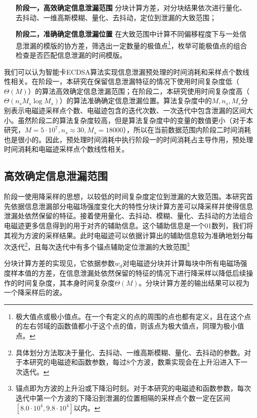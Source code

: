 {	\begin{itemize}
		\item [\textbf{阶段一，高效确定信息泄漏范围}]分块计算方差，对分块结果依次进行量化、去抖动、一维高斯模糊、量化、去抖动，定位到泄漏的大致范围；
		\item [\textbf{阶段二，准确确定信息泄漏位置}]在大致范围中计算不同偏移程度下与一处信息泄漏的模版的协方差，筛选出一定数量的极值点\footnote{极大值点或极小值点。在一个有定义的点的周围的点也都有定义，且在这个点的左右邻域的函数值都小于这个点的值，则该点为极大值点，同理为极小值点。}，枚举可能极值点的组合检查是否匹配信息泄漏的时间模版。
	\end{itemize}

	我们可以认为智能卡ECDSA算法实现信息泄漏预处理的时间消耗和采样点个数线性相关。在阶段一，本研究在保留信息泄漏特征的情况下使用时间复杂度低（$\Theta(M)$）的算法高效确定信息泄漏范围；在阶段二，本研究使用时间复杂度高（$\Theta(n_sM_s\log M_s)$）的算法准确确定信息泄漏位置。算法复杂度中的$M,n_s,M_s$分别表示电磁迹采样点个数、电磁迹包含的迭代次数、一次迭代中包含泄漏的区间大小。虽然阶段二的算法复杂度较高，但是算法复杂度中的变量的数值更小（对于本研究，$M=5\cdot10^7,n_s\approx 30,M_s=18000$），所以在当前数据范围内阶段二时间消耗也是很小的。因此，预处理时间消耗中执行阶段一的时间消耗占主导作用，预处理时间消耗和电磁迹采样点个数线性相关。

	\subsection{高效确定信息泄漏范围}\label{subs:phase1}
	阶段一使用降采样的思想，以较低的时间复杂度定位到泄漏的大致范围。本研究首先依据信息泄漏部分电磁场强度变化大的特性分块计算方差可以降采样并使得信息泄漏处依然保留的特征。接着使用量化、去抖动、模糊、量化、去抖动的方法组合电磁迹更多信息得到的用于对齐的辅助信息。这个辅助信息是一个01数列，我们将其视为方波的采样结果。此时电磁迹可以依据计算出的辅助信息较为准确地划分每次迭代\footnote{具体划分方法取决于量化、去抖动、一维高斯模糊、量化、去抖动的参数。对于本研究的电磁迹和函数参数，每过8个方波，数乘实现会在上升沿进入下一次迭代。}，且每次迭代中有多个锚点辅助定位泄漏的大致范围\footnote{锚点即为方波的上升沿或下降沿时刻。对于本研究的电磁迹和函数参数，每次迭代中第一个方波的下降沿到泄漏的位置相隔的采样点个数一定在区间$[8.0\cdot10^{4},9.8\cdot10^{4}]$以内。}
	
	分块计算方差的实现见，它依据参数$w_d$对电磁迹分块并计算每块中所有电磁场强度样本值的方差，在信息泄漏处依然保留的特征的情况下进行降采样以降低后续操作的时间复杂度，其本身时间复杂度$\Theta(M)$。分块计算方差的输出结果可以视为一个降采样后的波。
	
}
